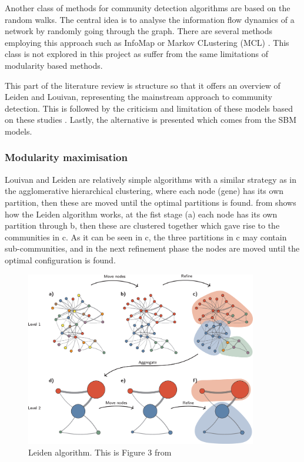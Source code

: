 Another class of methods for community detection algorithms are based on the random walks. The central idea is to analyse the information flow dynamics of a network by randomly going through the graph. There are several methods employing this approach such as InfoMap  \citet{Rosvall2008-kw} or Markov CLustering (MCL) \citet{Van_Dongen2008-yj}. This class is not explored in this project as suffer from the same limitations of modularity based methods\cite{Peixoto2021-jx}.

This part of the literature review is structure so that it offers an overview of Leiden and Louivan, representing the mainstream approach to community detection. This is followed by the criticism and limitation of these models based on these studies \cite{Peixoto2021-jx, Peixoto2023-rt, Shemirani2023-ww}. Lastly, the alternative is presented which comes from the SBM models.


\subsubsection{Modularity maximisation}

Louivan \citet{Blondel2008-ik} and Leiden \citet{Traag2019-ne} are relatively simple algorithms with a similar strategy as in the agglomerative hierarchical clustering, where each node (gene) has its own partition, then these are moved until the optimal partitions is found.  from \cite{Traag2019-ne} shows how the Leiden algorithm works, at the fist stage (a) each node has its own partition through b, then these are clustered together which gave rise to the communities in c. As it can be seen in c, the three partitions in c may contain sub-communities, and in the next refinement phase the nodes are moved until the optimal configuration is found.

\begin{figure}[!htb]    
    \centering
\includegraphics[width=0.9\textwidth,height=0.9\textheight,keepaspectratio]{Sections/Lit_review/Resources/Leiden_algorithm.png}
    \caption{Leiden algorithm. This is Figure 3 from \citet{Traag2019-ne}}
    \label{fig:N_I:leiden-explained}
\end{figure}



